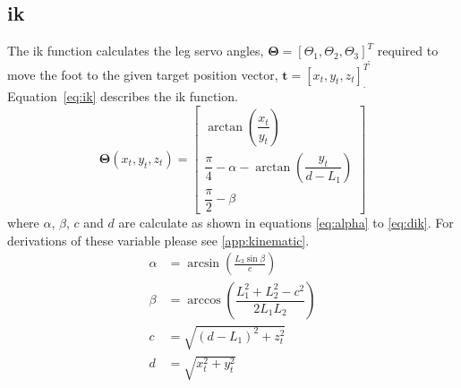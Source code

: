         \newpage
        \subsection{\acf{ik}}
            The \ac{ik} function calculates the leg servo angles, \(\bm{\Theta} = [\Theta_1, \Theta_2, \Theta_3]^T_{\displaystyle ,}\) required
            to move the foot to the given target position vector, \(\bm{t} = [x_t,y_t,z_t]^T_{\displaystyle .}\)
            \hbox{Equation \ref{eq:ik}} describes the \ac{ik} function.
            \begin{equation}\label{eq:ik}
                \bm{\Theta}(x_t,y_t,z_t) =
                                    \begin{bmatrix}
                                        \arctan{\left(\dfrac{x_t}{y_t}\right)}\\[0.5cm]
                                        \dfrac{\pi}{4} - \alpha - \arctan{\left(\dfrac{y_t}{d-L_1}\right)}\\[0.5cm]
                                        \dfrac{\pi}{2} - \beta
                                    \end{bmatrix}
            \end{equation}
            where \(\alpha\), \(\beta\), \(c\) and \(d\) are calculate as shown in equations \ref{eq:alpha} to \ref{eq:dik}. For derivations of these variable
            please see \ref{app:kinematic}.
            \begin{align}
                \alpha &= \arcsin{\left(\frac{L_3\sin{\beta}}{c}\right)} \label{eq:alpha} \\[0.5cm]
                \beta &= \arccos{\left(\dfrac{L_1^2 + L_2^2 -c^2}{2L_1L_2}\right)}\\[0.5cm]
                c &= \sqrt{(d-L_1)^2+z_t^2}\\[0.5cm]
                d &= \sqrt{x_t^2 + y_t^2} \label{eq:dik}
            \end{align}
